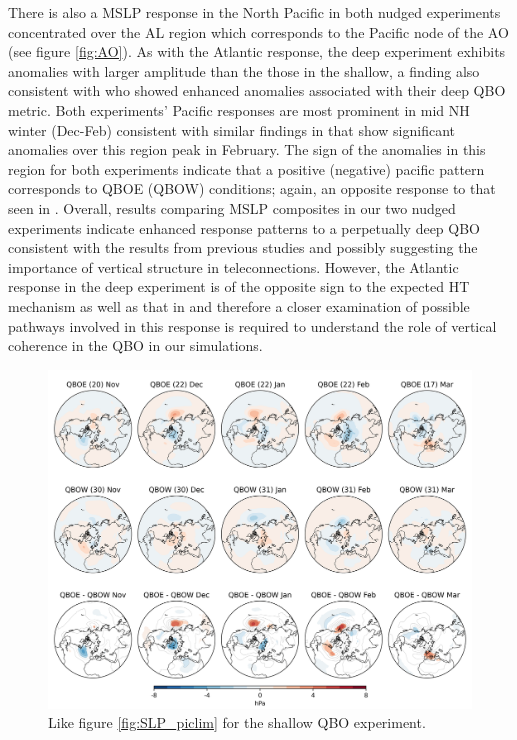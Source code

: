 There is also a MSLP response in the North Pacific in both nudged experiments concentrated over the AL region which corresponds to the Pacific node of the AO (see figure \ref{fig:AO}). As with the Atlantic response, the deep experiment exhibits anomalies with larger amplitude than the those in the shallow, a finding also consistent with \cite{andrewsObserved2019d} who showed enhanced anomalies associated with their deep QBO metric. Both experiments' Pacific responses are most prominent in mid NH winter (Dec-Feb) consistent with similar findings in \cite{graySurface2018b} that show significant anomalies over this region peak in February. The sign of the anomalies in this region for both experiments indicate that a positive (negative) pacific pattern corresponds to QBOE (QBOW) conditions; again, an opposite response to that seen in \citep{andrewsObserved2019d}. Overall, results comparing MSLP composites in our two nudged experiments indicate enhanced response patterns to a perpetually deep QBO consistent with the results from previous studies \citep{graySurface2018b, andrewsObserved2019d} and possibly suggesting the importance of vertical structure in teleconnections. However, the Atlantic response in the deep experiment is of the opposite sign to the expected HT mechanism as well as that in \citep{andrewsObserved2019d} and therefore a closer examination of possible pathways involved in this response is required to understand the role of vertical coherence in the QBO in our simulations.

\begin{figure}[h!]
\begin{center}
\noindent\includegraphics[width =0.8\linewidth]{Figures/Figures-deepQBO/SLP_composites_individual_months_QBO_phases_U_s_50hPa_5thresh.png}
\caption[]{Like figure \ref{fig:SLP_piclim} for the shallow QBO experiment.}
\label{fig:SLP_shallow}
\end{center}
\end{figure}
\newpage

